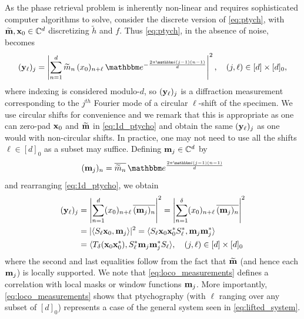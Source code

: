 As the phase retrieval problem is inherently non-linear and requires sophisticated computer algorithms to solve, consider the discrete version of \eqref{eq:ptych}, with $\widetilde{\mathbf m}, \mathbf x_0 \in \mathbb{C}^d$ discretizing $\widetilde{h}$ and $f$.  Thus \eqref{eq:ptych}, in the absence of noise, becomes 
%
\begin{equation}
    (\y_\ell)_j = \left \vert \sum_{n=1}^d \widetilde m_n \, (x_0)_{n+\ell} \,
      \mathbbm e^{-\frac{2\pi \mathbbm i (j-1) (n-1)}d} 
      \right \vert^2, \quad (j,\ell) \in [d] \times  
      [d]_0, 
  \label{eq:1d_ptycho}
\end{equation}
%
where indexing is considered modulo-$d$, so $(\mathbf y_\ell)_j$ is a diffraction measurement corresponding to the $j^{th}$ Fourier mode of a circular $\ell$-shift of the specimen. We use circular shifts for convenience and we remark that this is appropriate as one can zero-pad $\mathbf x_0$ and $\widetilde{\mathbf m}$  in \eqref{eq:1d_ptycho} and obtain the same $(\mathbf y_\ell)_j$ as one would with non-circular shifts. In practice, one may not need to use all the shifts $\ell \in [d]_0$ as a subset may suffice.  Defining $\mathbf m_j \in \mathbb{C}^d$ by \begin{equation} (\m_j)_n = \overline{\widetilde m_n} \, \mathbbm e^{\frac{2\pi \mathbbm i (j-1) (n-1)}d} \label{eq:ptychm} \end{equation} and rearranging \eqref{eq:1d_ptycho}, we obtain
\begin{align}
    (\y_\ell)_j &= \left \vert \sum_{n=1}^d (x_0)_{n+\ell} \, \overline{(\m_j)_n} \right \vert^2 \label{eq:loco_measurements} %
        = \left \vert \sum_{n=1}^\delta (x_0)_{n+\ell} \, \overline{(\m_j)_n} \right \vert^2 \\
        &= \lvert \langle S_\ell \x_0, \m_j \rangle \rvert^2 \notag %
       = \langle S_\ell \x_0 \x_0^* S_\ell^*, \m_j \m_j^* \rangle \notag\\
        &= \langle T_\delta(\x_0 \x_0^*), S_\ell^* \m_j \m_j^* S_\ell \rangle, \quad (j, \ell) \in [d] \times [d]_0 \notag
\end{align}
%
where the second and last equalities follow from the fact that $\widetilde {\mathbf m}$ (and hence each $\mathbf m_j$) is locally supported.  We note that \eqref{eq:loco_measurements} defines a correlation with local masks or window functions $\mathbf m_j$.  More importantly, \eqref{eq:loco_measurements} shows that ptychography (with $\ell$ ranging over any subset of $[d]_0$) represents a case of the general system seen in \eqref{eq:lifted_system}.

